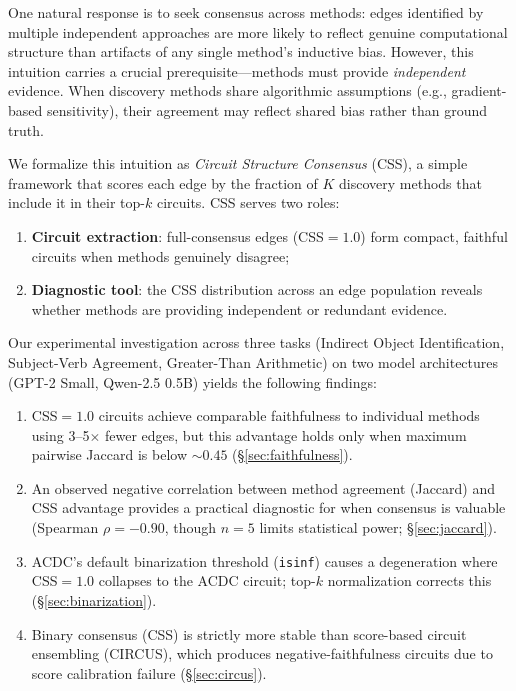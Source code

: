 \documentclass[11pt,a4paper]{article}
\newcommand{\css}{\textsc{CSS}}
\begin{document}
One natural response is to seek consensus across methods: edges identified by multiple independent approaches are more likely to reflect genuine computational structure than artifacts of any single method's inductive bias.
However, this intuition carries a crucial prerequisite---methods must provide \emph{independent} evidence.
When discovery methods share algorithmic assumptions (e.g., gradient-based sensitivity), their agreement may reflect shared bias rather than ground truth.

We formalize this intuition as \emph{Circuit Structure Consensus} (\css{}), a simple framework that scores each edge by the fraction of $K$ discovery methods that include it in their top-$k$ circuits.
\css{} serves two roles:
\begin{enumerate}[nosep]
    \item \textbf{Circuit extraction}: full-consensus edges (\css{}$=1.0$) form compact, faithful circuits when methods genuinely disagree;
    \item \textbf{Diagnostic tool}: the \css{} distribution across an edge population reveals whether methods are providing independent or redundant evidence.
\end{enumerate}

Our experimental investigation across three tasks (Indirect Object Identification, Subject-Verb Agreement, Greater-Than Arithmetic) on two model architectures (GPT-2 Small, Qwen-2.5 0.5B) yields the following findings:

\begin{enumerate}[nosep]
    \item \css{}$=1.0$ circuits achieve comparable faithfulness to individual methods using 3--5$\times$ fewer edges, but this advantage holds only when maximum pairwise Jaccard is below ${\sim}0.45$ (\S\ref{sec:faithfulness}).
    \item An observed negative correlation between method agreement (Jaccard) and \css{} advantage provides a practical diagnostic for when consensus is valuable (Spearman $\rho = -0.90$, though $n\!=\!5$ limits statistical power; \S\ref{sec:jaccard}).
    \item ACDC's default binarization threshold (\texttt{isinf}) causes a degeneration where \css{}$=1.0$ collapses to the ACDC circuit; top-$k$ normalization corrects this (\S\ref{sec:binarization}).
    \item Binary consensus (\css{}) is strictly more stable than score-based circuit ensembling (CIRCUS), which produces negative-faithfulness circuits due to score calibration failure (\S\ref{sec:circus}).
\end{enumerate}
\end{document}
